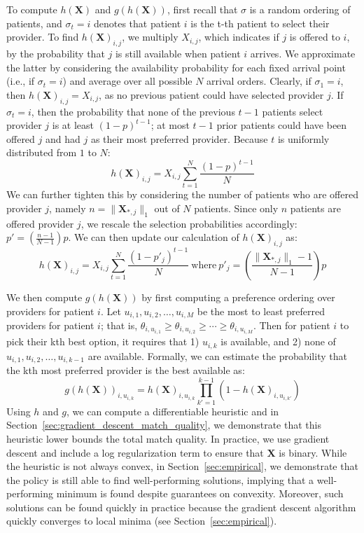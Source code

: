 \documentclass[11pt]{article}
\begin{document}
To compute $h(\mathbf{X})$ and $g(h(\mathbf{X}))$,
first recall that $\sigma$ is a random ordering of patients, and $\sigma_{t} = i$ denotes that patient $i$ is the t-th patient to select their provider. 
To find $h(\mathbf{X})_{i,j}$, we multiply $X_{i,j}$, which indicates if $j$ is offered to $i$, by the probability that $j$ is still available when patient $i$ arrives. 
We approximate the latter by considering the availability probability for each fixed arrival point (i.e., if $\sigma_t = i$) and average over all possible $N$ arrival orders. 
Clearly, if $\sigma_{1} = i$, then $h(\mathbf{X})_{i,j} = X_{i,j}$, as no previous patient could have selected provider $j$. 
If $\sigma_t = i$, then the probability that none of the previous $t-1$ patients select provider $j$ is at least $(1-p)^{t-1}$; at most $t-1$ prior patients could have been offered $j$ and had $j$ as their most preferred provider. 
Because $t$ is uniformly distributed from $1$ to $N$: 
\begin{equation}
    h(\mathbf{X})_{i,j} = X_{i,j}\sum_{t=1}^{N} \frac{(1-p)^{t-1}}{N} 
\end{equation}
We can further tighten this by considering the number of patients who are offered provider $j$, namely $n = \lVert \mathbf{X}_{*,j} \rVert_{1}$ out of $N$ patients. Since only $n$ patients are offered provider $j$, we rescale the selection probabilities accordingly: $p' = \left(\frac{n-1}{N-1}\right)p$. 
We can then update our calculation of $h(\mathbf{X})_{i,j}$ as:
{\small \begin{equation}
h(\mathbf{X})_{i,j} = X_{i,j}\sum_{t=1}^{N} \frac{(1-p'_{j})^{t-1}}{N}\  \mathrm{ where } \ p'_{j} = \left( \frac{\lVert \mathbf{X}_{*,j} \rVert_{1}-1}{N-1} \right) p
\end{equation}}

We then compute $g(h(\mathbf{X}))$ by first computing a preference ordering over providers for patient $i$. 
Let $u_{i,1},u_{i,2},\ldots,u_{i,M}$ be the most to least preferred providers for patient $i$; that is, $\theta_{i,u_{i,1}} \geq \theta_{i,u_{i,2}} \geq \cdots \geq \theta_{i,u_{i,M}}$. 
Then for patient $i$ to pick their kth best option, it requires that 1) $u_{i,k}$ is available, and 2) none of $u_{i,1},u_{i,2},\ldots,u_{i,k-1}$ are available. 
Formally, we can estimate the probability that the kth most preferred provider is the best available as: 
\begin{equation}
    g(h(\mathbf{X}))_{i,u_{i,k}} = h(\mathbf{X})_{i,u_{i,k}} \prod_{k'=1}^{k-1} (1-h(\mathbf{X})_{i,u_{i,k'}})
\end{equation}
Using $h$ and $g$, we can compute a differentiable heuristic and in Section~\ref{sec:gradient_descent_match_quality}, we demonstrate that this heuristic lower bounds the total match quality.  
In practice, we use gradient descent and include a log regularization term to ensure that $\mathbf{X}$ is binary. 
While the heuristic is not always convex, in Section~\ref{sec:empirical}, we demonstrate that the policy is still able to find well-performing solutions, implying that a well-performing minimum is found despite guarantees on convexity. 
Moreover, such solutions can be found quickly in practice because the gradient descent algorithm quickly converges to local minima (see Section~\ref{sec:empirical}). 
\end{document}
